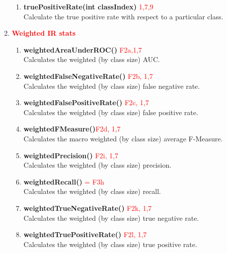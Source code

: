 \documentclass[a4paper,12pt]{article}
\begin{document}
\begin{enumerate}
\begin{enumerate}
\item \textbf{truePositiveRate(int classIndex)} \textcolor{red}{1,7,9}
          \\Calculate the true positive rate with respect to a particular class.
\end{enumerate}     

\item \textbf{\textcolor{red}{Weighted IR stats}}
\begin{enumerate}
\item \textbf{weightedAreaUnderROC()} \textcolor{red}{F2a,1,7}
          \\Calculates the weighted (by class size) AUC. 

\item \textbf{weightedFalseNegativeRate()} \textcolor{red}{F2b, 1,7}
          \\Calculates the weighted (by class size) false negative rate. 
          
\item \textbf{weightedFalsePositiveRate()} \textcolor{red}{F2c, 1,7}
         \\ Calculates the weighted (by class size) false positive rate.                    

\item \textbf{weightedFMeasure()}\textcolor{red}{F2d, 1,7}
        \\  Calculates the macro weighted (by class size) average F-Measure. 
                 
\item \textbf{weightedPrecision()} \textcolor{red}{F2i, 1,7}
         \\ Calculates the weighted (by class size) precision. 
                    
\item \textbf{weightedRecall()} \textcolor{red}{= F3h}
        \\  Calculates the weighted (by class size) recall.          

\item \textbf{weightedTrueNegativeRate()} \textcolor{red}{F2k, 1,7}
        \\  Calculates the weighted (by class size) true negative rate. 

\item \textbf{weightedTruePositiveRate()} \textcolor{red}{F2l, 1,7}
         \\ Calculates the weighted (by class size) true positive rate. 
\end{enumerate}
     


\end{enumerate}
\end{document}
